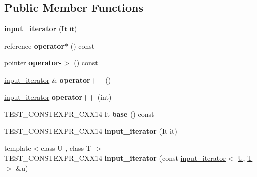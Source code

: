 \subsection*{Public Member Functions}
\begin{DoxyCompactItemize}
\item 
\mbox{\label{classinput__iterator_a2da39a3df57130444883ac8a7d8282e3}} 
{\bfseries input\+\_\+iterator} (It it)
\item 
\mbox{\label{classinput__iterator_a89d89d9ebf413f39d4c9d88e74dfb4c6}} 
reference {\bfseries operator$\ast$} () const
\item 
\mbox{\label{classinput__iterator_aca0ddd9c332b953d38d76510b0349d76}} 
pointer {\bfseries operator-\/$>$} () const
\item 
\mbox{\label{classinput__iterator_aea304209af2d12c88fe241b94e1d863c}} 
\mbox{\hyperlink{classinput__iterator}{input\+\_\+iterator}} \& {\bfseries operator++} ()
\item 
\mbox{\label{classinput__iterator_a925cd0383940583f7f095e62add2adfb}} 
\mbox{\hyperlink{classinput__iterator}{input\+\_\+iterator}} {\bfseries operator++} (int)
\item 
\mbox{\label{classinput__iterator_a4e2c5d0f1793e0cf51ade246995710b6}} 
T\+E\+S\+T\+\_\+\+C\+O\+N\+S\+T\+E\+X\+P\+R\+\_\+\+C\+X\+X14 It {\bfseries base} () const
\item 
\mbox{\label{classinput__iterator_a1a87eb94c18deff3a068e73b42eaa34b}} 
T\+E\+S\+T\+\_\+\+C\+O\+N\+S\+T\+E\+X\+P\+R\+\_\+\+C\+X\+X14 {\bfseries input\+\_\+iterator} (It it)
\item 
\mbox{\label{classinput__iterator_a35ba625280b7f03c28eb06a2d9abeb46}} 
{\footnotesize template$<$class U , class T $>$ }\\T\+E\+S\+T\+\_\+\+C\+O\+N\+S\+T\+E\+X\+P\+R\+\_\+\+C\+X\+X14 {\bfseries input\+\_\+iterator} (const \mbox{\hyperlink{classinput__iterator}{input\+\_\+iterator}}$<$ \mbox{\hyperlink{union_u}{U}}, \mbox{\hyperlink{struct_t}{T}} $>$ \&u)
\item 

\end{DoxyCompactItemize}

